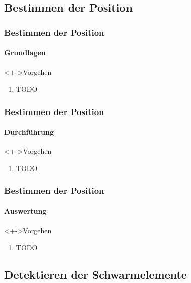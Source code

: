 \documentclass{beamer}
\begin{document}

\subsection[Position]{Bestimmen der Position}


\begin{frame}
	\frametitle{Bestimmen der Position}\framesubtitle{Grundlagen}
	\begin{block}<+->{Vorgehen}
		\begin{enumerate}
		  \item TODO
		\end{enumerate}
	\end{block}
\end{frame}


\begin{frame}
	\frametitle{Bestimmen der Position}\framesubtitle{Durchf\"uhrung}
	\begin{block}<+->{Vorgehen}
		\begin{enumerate}
		  \item TODO
		\end{enumerate}
	\end{block}
\end{frame}


\begin{frame}
	\frametitle{Bestimmen der Position}\framesubtitle{Auswertung}
	\begin{block}<+->{Vorgehen}
		\begin{enumerate}
		  \item TODO
		\end{enumerate}
	\end{block}
\end{frame}


\subsection[Detektion]{Detektieren der Schwarmelemente}

\end{document}
